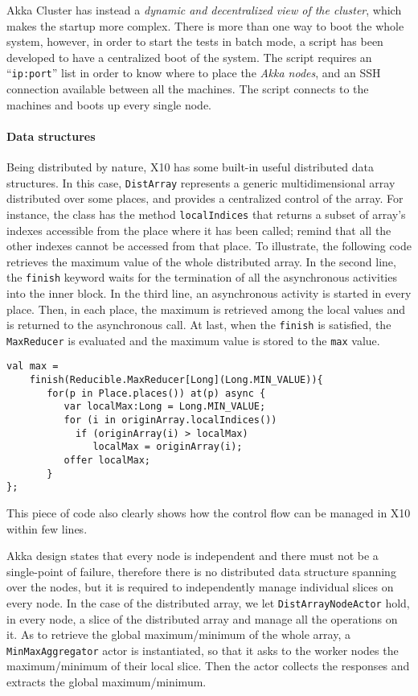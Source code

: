 \documentclass[a4paper]{article}
\numberwithin{equation}{section}
\begin{document}
Akka Cluster has instead a \emph{dynamic and decentralized view of the
cluster}, which makes the startup more complex. 
There is more than one way to boot the whole system,
however, in order to start the tests in batch mode, a script has been
developed to have a centralized boot of the system. 
The script requires an ``\verb+ip:port+'' list in order to know where
to place the \emph{Akka nodes}, and an SSH connection available
between all the machines. The script connects to the machines and
boots up every single node. 


\paragraph{Data structures}
Being distributed by nature, X10 has some built-in useful
distributed data structures. In this case, \verb+DistArray+ represents
a generic multidimensional array distributed over some places, and
provides a centralized control of the array. 
For instance, the class
has the method \verb+localIndices+ that returns a subset of array's
indexes accessible from the place where it has been called; remind
that all the other indexes cannot be accessed from that place.
To illustrate, the following code retrieves the maximum value of the
whole distributed array. In the second line, the \verb+finish+ keyword
waits for the termination of all the asynchronous activities into the
inner block. 
In the third line, an asynchronous activity is started in every
place. Then, in each place, the maximum is retrieved
among the local values and is returned to the asynchronous call. At
last, when the \verb+finish+ is satisfied, the \verb+MaxReducer+ is
evaluated and the maximum value is stored to the \verb+max+ value. 

{\small
\begin{verbatim}
val max =  
    finish(Reducible.MaxReducer[Long](Long.MIN_VALUE)){
       for(p in Place.places()) at(p) async {
          var localMax:Long = Long.MIN_VALUE;
          for (i in originArray.localIndices())
            if (originArray(i) > localMax) 
               localMax = originArray(i);
          offer localMax;
       } 
};
\end{verbatim}
}
This piece of code also clearly shows how the control flow can be
managed in X10 within few lines.

Akka design states that every node is independent
and there must not be a single-point of failure, therefore 
there is no distributed data structure spanning over the
nodes, but it is
required to independently manage individual slices on every node. 
In the case of the distributed array, we let \verb+DistArrayNodeActor+
hold, in every node, a slice of the distributed array and manage all
the operations on it. 
As to retrieve the global maximum/minimum of the whole array, a
\verb+MinMaxAggregator+ actor is instantiated, so that it asks to the 
worker nodes the maximum/minimum of their local slice. Then the actor
collects the responses and extracts the global maximum/minimum.  
\end{document}
